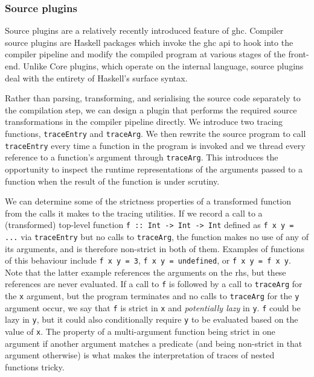 \documentclass[thesis=B,english]{FITthesis}[2019/12/23]
\newcommand{\hsIdent}[1]{\texttt{#1}}
\newcommand{\hsCode}[1]{\texttt{#1}}
\begin{document}
\subsubsection*{Source plugins}
Source plugins\cite{ghc-source-plugins} are a relatively recently introduced
feature of \acrshort{ghc}. Compiler source plugins are Haskell packages which
invoke the \acrshort{ghc} \acrshort{api} to hook into the compiler pipeline and
modify the compiled program at various stages of the front-end. Unlike Core
plugins\cite{ghc-compiler-plugins}, which operate on the internal language,
source plugins deal with the entirety of Haskell's surface syntax.

Rather than parsing, transforming, and serialising the source code separately
to the compilation step, we can design a plugin that performs the required
source transformations in the compiler pipeline directly. We introduce two
tracing functions, \hsIdent{traceEntry} and \hsIdent{traceArg}. We then rewrite
the source program to call \hsIdent{traceEntry} every time a function in the
program is invoked and we thread every reference to a function's argument
through \hsIdent{traceArg}. This introduces the opportunity to inspect the
runtime representations of the arguments passed to a function when the result
of the function is under scrutiny.

We can determine some of the strictness properties of a transformed function
from the calls it makes to the tracing utilities. If we record a call to a
(transformed) top-level function \hsCode{f :: Int -> Int -> Int} defined as
\hsCode{f x y = ...} via \hsIdent{traceEntry} but no calls to
\hsIdent{traceArg}, the function makes no use of any of its arguments, and is
therefore non-strict in both of them. Examples of functions of this behaviour
include \hsCode{f x y = 3}, \hsCode{f x y = undefined}, or \hsCode{f x y = f x
y}. Note that the latter example references the arguments on the
\acrshort{rhs}, but these references are never evaluated. If a call to
\hsIdent{f} is followed by a call to \hsIdent{traceArg} for the \hsIdent{x}
argument, but the program terminates and no calls to \hsIdent{traceArg} for the
\hsIdent{y} argument occur, we say that \hsIdent{f} is strict in \hsIdent{x}
and \textit{potentially lazy} in \hsIdent{y}. \hsIdent{f} could be lazy in
\hsIdent{y}, but it could also conditionally require \hsIdent{y} to be
evaluated based on the value of \hsIdent{x}. The property of a multi-argument
function being strict in one argument if another argument matches a predicate
(and being non-strict in that argument otherwise) is what makes the
interpretation of traces of nested functions tricky.
\end{document}
